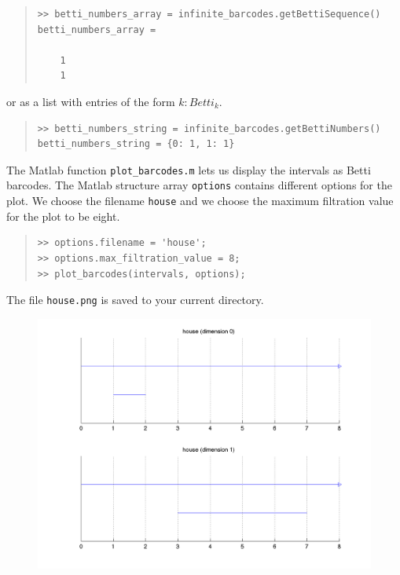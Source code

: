\documentclass[amscd, amssymb, verbatim]{amsart}[12pt]
\theoremstyle{remark}
\theoremstyle{remark}
\theoremstyle{remark}
\begin{document}
\begin{quote} \begin{verbatim}
>> betti_numbers_array = infinite_barcodes.getBettiSequence()
betti_numbers_array =

    1
    1
\end{verbatim} \end{quote}

or as a list with entries of the form $k: Betti_k$.

\begin{quote} \begin{verbatim}
>> betti_numbers_string = infinite_barcodes.getBettiNumbers()
betti_numbers_string = {0: 1, 1: 1} 
\end{verbatim} \end{quote}

The Matlab function \texttt{plot\_barcodes.m} lets us display the intervals as Betti barcodes. The Matlab structure array \texttt{options} contains different options for the plot. We choose the filename \texttt{house} and we choose the maximum filtration value for the plot to be eight.
\begin{quote} \begin{verbatim}
>> options.filename = 'house';
>> options.max_filtration_value = 8;
>> plot_barcodes(intervals, options);
\end{verbatim} \end{quote}

The file \texttt{house.png} is saved to your current directory.

\begin{figure}[htp]
	\begin{center}
    	\includegraphics[width=6in]{house.png}
   	\end{center}
\end{figure}
\FloatBarrier
\end{document}
